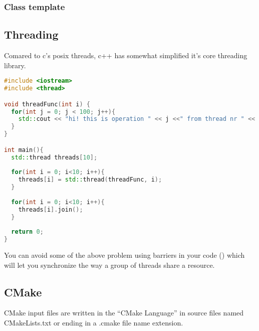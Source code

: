 \subsubsection{Class template}


\subsection{Threading} 
Comared to c's posix threads, c++ has somewhat simplified it's core threading library. 
\begin{lstlisting}[language=c++]
#include <iostream>
#include <thread>

void threadFunc(int i) {
  for(int j = 0; j < 100; j++){
    std::cout << "hi! this is operation " << j <<" from thread nr " << i << std::endl;
  }
}

int main(){
  std::thread threads[10];
  
  for(int i = 0; i<10; i++){
    threads[i] = std::thread(threadFunc, i);
  }
  
  for(int i = 0; i<10; i++){
    threads[i].join();
  }
  
  return 0;
}
\end{lstlisting}
You can avoid some of the above problem using barriers in your code () which will let you synchronize the way a group of threads share a resource.




\subsection{CMake}
CMake input files are written in the “CMake Language” in source files named CMakeLists.txt or ending in a .cmake file name extension.

